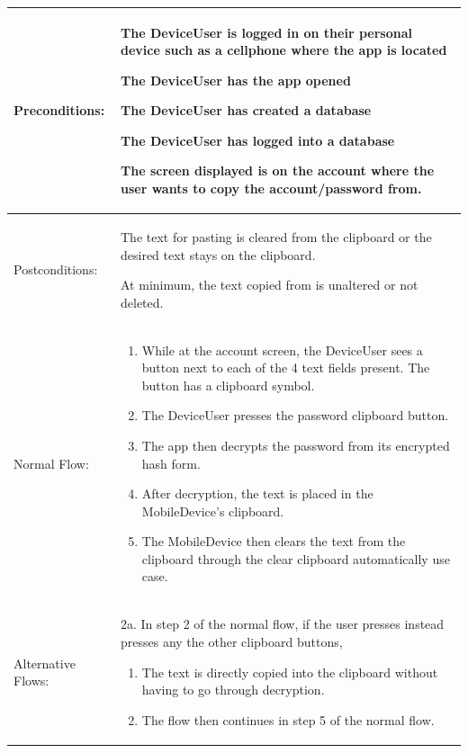 \documentclass[stu]{apa7}
\newcommand{\nextitem}{\par\hspace*{\labelsep}\textbullet\hspace*{\labelsep}}
\newcommand{\nextitemblank}{\par\hspace*{\labelsep}\hspace*{\labelsep}}
\begin{document}
{{{{\begin{xltabular}{\textwidth}{|l|X|}
             Preconditions: & \nextitem The DeviceUser is logged in on their personal device such as a cellphone where the app is located
                              \nextitem The DeviceUser has the app opened
                              \nextitem The DeviceUser has created a database
                              \nextitem The DeviceUser has logged into a database
                              \nextitem The screen displayed is on the account where the user wants to copy the account/password from. \\ \hline

              Postconditions: & \nextitem The text for pasting is cleared from the clipboard or the desired text stays on the clipboard.
                                \nextitem At minimum, the text copied from is unaltered or not deleted. \\ \hline

              Normal Flow: &
                             \begin{enumerate}
                               \item While at the account screen, the DeviceUser sees a button next to each of the 4 text fields present. The button has a clipboard symbol.
                               \item The DeviceUser presses the password clipboard button.
                               \item The app then decrypts the password from its encrypted hash form.
                               \item After decryption, the text is placed in the MobileDevice’s clipboard.
                               \item The MobileDevice then clears the text from the clipboard through the clear clipboard automatically use case.
                             \end{enumerate} \\ \hline

              Alternative Flows: &
                                   \nextitemblank 2a. In step 2 of the normal flow, if the user presses instead presses any the other clipboard buttons,
                                   \begin{enumerate}
                                     \item The text is directly copied into the clipboard without having to go through decryption.
                                     \item The flow then continues in step 5 of the normal flow.
                                   \end{enumerate}


\end{xltabular}}}}}
\end{document}
